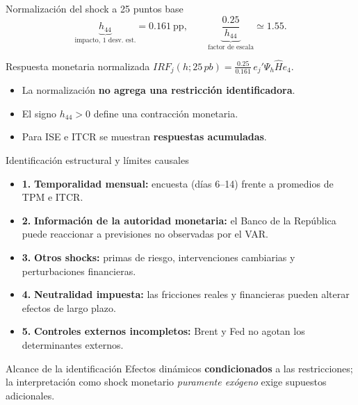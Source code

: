 \documentclass{beamer}
\begin{document}
\begin{frame}{Normalización del shock a 25 puntos base}
 \small
 \begin{equation*}
 \underbrace{h_{44}}_{\text{impacto, 1 desv. est.}}=0.161\ \text{pp},
 \qquad \underbrace{\frac{0.25}{h_{44}}}_{\text{factor de escala}}
 \simeq 1.55.
 \end{equation*}
 \begin{block}{Respuesta monetaria normalizada}
 \centering
 \large $\displaystyle IRF_j(h;25\,pb)=\frac{0.25}{0.161}\,e_j'\Psi_h\widehat H e_4.$
 \end{block}
 \begin{itemize}
  \item La normalización \textbf{no agrega una restricción identificadora}.
  \item El signo $h_{44}>0$ define una contracción monetaria.
  \item Para ISE e ITCR se muestran \textbf{respuestas acumuladas}.
 \end{itemize}
\end{frame}

\begin{frame}{Identificación estructural y límites causales}
 \footnotesize
 \begin{itemize}
  \item \textbf{1.} \textbf{Temporalidad mensual:} encuesta (días 6--14) frente a promedios de TPM e ITCR.
  \item \textbf{2.} \textbf{Información de la autoridad monetaria:} el Banco de la República puede reaccionar a previsiones no observadas por el VAR.
  \item \textbf{3.} \textbf{Otros shocks:} primas de riesgo, intervenciones cambiarias y perturbaciones financieras.
  \item \textbf{4.} \textbf{Neutralidad impuesta:} las fricciones reales y financieras pueden alterar efectos de largo plazo.
  \item \textbf{5.} \textbf{Controles externos incompletos:} Brent y Fed no agotan los determinantes externos.
 \end{itemize}
 \vspace{0.06cm}
 \begin{alertblock}{Alcance de la identificación}
 \footnotesize Efectos dinámicos \textbf{condicionados} a las restricciones; la interpretación como shock
 monetario \emph{puramente exógeno} exige supuestos adicionales.
 \end{alertblock}
\end{frame}
\end{document}
